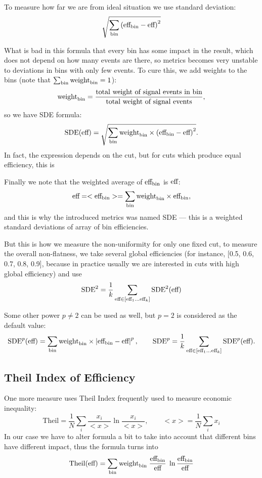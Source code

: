 \documentclass{JINST}
\theoremstyle{definition}
\theoremstyle{remark}
\newcommand{\abs}[1]{\left\vert#1\right\vert}
\begin{document}
To measure how far we are from ideal situation we use standard deviation:
\[
	\sqrt{\sum_{\text{bin}} \left( \text{eff}_\text{bin} - \text{eff} \right)^2  }
\]

What is bad in this formula that every bin has some impact in the result, which does not depend on how many events are there, so metrics becomes very unstable to deviations in bins with only few events. To cure this, we add weights to the bins (note that $\sum_{\text{bin}} \text{weight}_\text{bin} = 1$):
\[
	\text{weight}_\text{bin} = \dfrac{\text{total weight of signal events in bin}}
		{\text{total weight of signal events}},
\]
so we have SDE formula:
\[
	\text{SDE}(\text{eff}) = 
	\sqrt{\sum_{\text{bin}} \text{weight}_\text{bin} \times \left(\text{eff}_\text{bin} - \text{eff} \right)^2}. 
\] 
In fact, the expression depends on the cut, but for cuts which produce equal efficiency, this is 


Finally we note that the weighted average of $\text{eff}_\text{bin}$ is $\text{eff}$:
\[
	\text{eff} = < \text{eff}_\text{bin} > =  \sum_{\text{bin}} \text{weight}_\text{bin} \times \text{eff}_\text{bin},
\]
and this is why the introduced metrics was named SDE --- this is a weighted standard deviations of array of bin efficiencies.

But this is how we measure the non-uniformity for only one fixed cut, to measure the overall non-flatness, we take several global efficiencies (for instance, [0.5, 0.6, 0.7, 0.8, 0.9], because in practice usually we are interested in cuts with high global efficiency) and use 
\[
	\text{SDE}^2  =  \frac{1}{k} 
	\sum_{\text{eff} \in [\text{eff}_1 \dots \text{eff}_k] }  
		\text{SDE}^2(\text{eff})
\]

Some other power $p \neq 2$ can be used as well, but $p=2$ is considered as the default value: 
\[
	\SDE^p(\globaleff) = 
	\sum_{\bin} \binweight \times \abs{\bineff - \globaleff}^p,
\qquad
	\SDE^p  =  \frac{1}{k} 
	\sum_{\globaleff \in [\globaleff_1 \dots \globaleff_k] }  
		\text{SDE}^p(\globaleff).
\]



\subsection{Theil Index of Efficiency}
\def\theil{\text{Theil}}

One more measure uses Theil Index frequently used to measure economic inequality:
\[
	\theil = \frac{1}{N} \sum_i \frac{x_i}{<x>} \ln{\frac{x_i}{<x>}}, 
		\qquad <x> = \frac{1}{N} \sum_i x_i
\]
In our case we have to alter formula a bit to take into account that different bins have different impact, thus the formula turns into
\[
	\theil(\globaleff) = \sum_\bin \binweight \; \frac{\bineff}{\globaleff} \; \ln{\frac{\bineff}{\globaleff}}
\]
\end{document}

